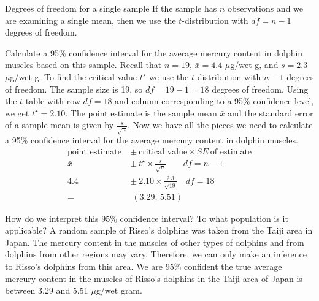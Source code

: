 \begin{onebox}{Degrees of freedom for a single sample}
If the sample has $n$ observations and we are examining a single mean, then we use the $t$-distribution with $df=n-1$ degrees of freedom.
\end{onebox}

\begin{examplewrap}
\begin{nexample}
{Calculate a 95\% confidence interval for the average mercury content in dolphin muscles based on this sample. Recall that $n=19$, $\bar{x}=4.4$ $\mu$g/wet g, and $s=2.3$ $\mu$g/wet g.  }
To find the critical value $t^{\star}$ we use the $t$-distribution with $n-1$ degrees of freedom.  The sample size is 19, so $df=19-1=18$ degrees of freedom.  Using the $t$-table with row $df=18$ and column corresponding to a 95\% confidence level, we get $t^{\star}=2.10$.  The point estimate is the sample mean $\bar{x}$ and the standard error of a sample mean is given by $\frac{s}{\sqrt{n}}$.  Now we have all the pieces we need to calculate a 95\% confidence interval for the average mercury content in dolphin muscles.  
\begin{align*}
\text{point estimate} \ &\pm\  \text{critical value} \times SE \ \text{of estimate} \\
\bar{x} \ &\pm\  t^{\star}\times \frac{s}{\sqrt{n}} \qquad df=n-1\\
4.4 \ &\pm\  2.10 \times  \frac{2.3}{\sqrt{19}} \quad df=18 \\
= &\ (3.29 \text{, } 5.51)
\end{align*}

\end{nexample}
\end{examplewrap}

\begin{examplewrap}
\begin{nexample}
{How do we interpret this 95\% confidence interval?  To what population is it applicable?}
A random sample of Risso's dolphins was taken from the Taiji area in Japan.  The mercury content in the muscles of other types of dolphins and from dolphins from other regions may vary.  Therefore, we can only make an inference to Risso's dolphins from this area.  We are 95\% confident the true average mercury content in the muscles of Risso's dolphins in the Taiji area of Japan is between 3.29 and 5.51 $\mu$g/wet gram. 

\end{nexample}
\end{examplewrap}



